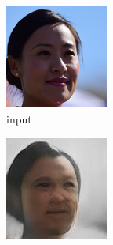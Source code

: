 \documentclass{article}
\begin{document}
\begin{figure}[h!]
    \caption{Dataset Face}
     \centering
     \begin{subfigure}[b]{0.24\textwidth}
         \centering
         \includegraphics[width=\textwidth]{illustration/face_input.png}
         \caption{input}
     \end{subfigure}
     \begin{subfigure}[b]{0.24\textwidth}
         \centering
         \includegraphics[width=\textwidth]{illustration/face_sngan_500.jpg}

\end{subfigure}
\end{figure}
\end{document}
